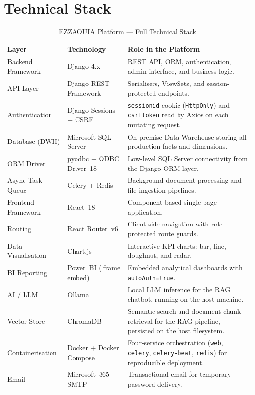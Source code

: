 \section{Technical Stack}
\begin{sloppypar}

\begin{table}[H]
\centering
\caption{EZZAOUIA Platform --- Full Technical Stack}
\label{tab:tech_stack}
\renewcommand{\arraystretch}{1.5}
\begin{tabular}{|l|l|p{7cm}|}
\hline
\rowcolor{blue!20}
\textbf{Layer} & \textbf{Technology} & \textbf{Role in the Platform} \\
\hline
Backend Framework & Django 4.x &
  REST API, ORM, authentication, admin interface, and business logic. \\
\hline
\rowcolor{gray!10}
API Layer & Django REST Framework &
  Serialisers, ViewSets, and session-protected endpoints. \\
\hline
Authentication & Django Sessions + CSRF &
  \texttt{sessionid} cookie (\texttt{HttpOnly}) and \texttt{csrftoken} read
  by Axios on each mutating request. \\
\hline
\rowcolor{gray!10}
Database (DWH) & Microsoft SQL Server &
  On-premise Data Warehouse storing all production facts and dimensions. \\
\hline
ORM Driver & pyodbc + ODBC Driver~18 &
  Low-level SQL Server connectivity from the Django ORM layer. \\
\hline
\rowcolor{gray!10}
Async Task Queue & Celery + Redis &
  Background document processing and file ingestion pipelines. \\
\hline
Frontend Framework & React~18 &
  Component-based single-page application. \\
\hline
\rowcolor{gray!10}
Routing & React Router~v6 &
  Client-side navigation with role-protected route guards. \\
\hline
Data Visualisation & Chart.js &
  Interactive KPI charts: bar, line, doughnut, and radar. \\
\hline
\rowcolor{gray!10}
BI Reporting & Power~BI (iframe embed) &
  Embedded analytical dashboards with \texttt{autoAuth=true}. \\
\hline
AI / LLM & Ollama &
  Local LLM inference for the RAG chatbot, running on the host machine. \\
\hline
\rowcolor{gray!10}
Vector Store & ChromaDB &
  Semantic search and document chunk retrieval for the RAG pipeline,
  persisted on the host filesystem. \\
\hline
Containerisation & Docker + Docker Compose &
  Four-service orchestration (\texttt{web}, \texttt{celery},
  \texttt{celery-beat}, \texttt{redis}) for reproducible deployment. \\
\hline
\rowcolor{gray!10}
Email & Microsoft~365 SMTP &
  Transactional email for temporary password delivery. \\
\hline
\end{tabular}
\end{table}

\end{sloppypar}

